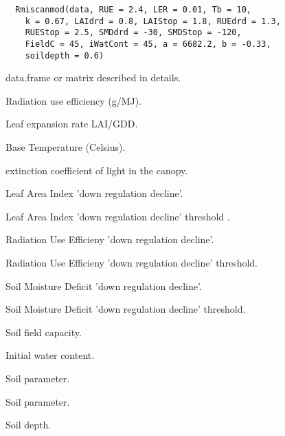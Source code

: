 \documentclass[letterpaper]{book}
\begin{document}
%
\begin{Usage}
\begin{verbatim}
  Rmiscanmod(data, RUE = 2.4, LER = 0.01, Tb = 10,
    k = 0.67, LAIdrd = 0.8, LAIStop = 1.8, RUEdrd = 1.3,
    RUEStop = 2.5, SMDdrd = -30, SMDStop = -120,
    FieldC = 45, iWatCont = 45, a = 6682.2, b = -0.33,
    soildepth = 0.6)
\end{verbatim}
\end{Usage}
%
\begin{Arguments}
\begin{ldescription}
\item[\code{data}] data.frame or matrix described in details.

\item[\code{RUE}] Radiation use efficiency (g/MJ).

\item[\code{LER}] Leaf expansion rate LAI/GDD.

\item[\code{Tb}] Base Temperature (Celsius).

\item[\code{k}] extinction coefficient of light in the canopy.

\item[\code{LAIdrd}] Leaf Area Index 'down regulation decline'.

\item[\code{LAIStop}] Leaf Area Index 'down regulation decline'
threshold .

\item[\code{RUEdrd}] Radiation Use Efficieny 'down regulation
decline'.

\item[\code{RUEStop}] Radiation Use Efficieny 'down regulation
decline' threshold.

\item[\code{SMDdrd}] Soil Moisture Deficit 'down regulation
decline'.

\item[\code{SMDStop}] Soil Moisture Deficit 'down regulation
decline' threshold.

\item[\code{FieldC}] Soil field capacity.

\item[\code{iWatCont}] Initial water content.

\item[\code{a}] Soil parameter.

\item[\code{b}] Soil parameter.

\item[\code{soildepth}] Soil depth.
\end{ldescription}
\end{Arguments}
\end{document}
